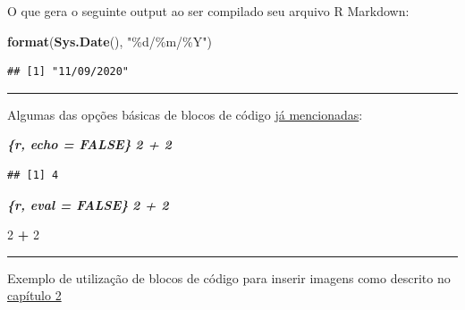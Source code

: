 \documentclass[
]{book}
\newenvironment{Shaded}{\begin{snugshade}}{\end{snugshade}}
\newcommand{\DecValTok}[1]{\textcolor[rgb]{0.00,0.00,0.81}{#1}}
\newcommand{\InformationTok}[1]{\textcolor[rgb]{0.56,0.35,0.01}{\textbf{\textit{#1}}}}
\newcommand{\KeywordTok}[1]{\textcolor[rgb]{0.13,0.29,0.53}{\textbf{#1}}}
\newcommand{\NormalTok}[1]{#1}
\newcommand{\OperatorTok}[1]{\textcolor[rgb]{0.81,0.36,0.00}{\textbf{#1}}}
\newcommand{\StringTok}[1]{\textcolor[rgb]{0.31,0.60,0.02}{#1}}
\begin{document}
O que gera o seguinte output ao ser compilado seu arquivo R Markdown:

\begin{Shaded}
\begin{Highlighting}[]
\KeywordTok{format}\NormalTok{(}\KeywordTok{Sys.Date}\NormalTok{(), }\StringTok{"\%d/\%m/\%Y"}\NormalTok{)}
\end{Highlighting}
\end{Shaded}

\begin{verbatim}
## [1] "11/09/2020"
\end{verbatim}

\begin{center}\rule{0.5\linewidth}{0.5pt}\end{center}

Algumas das opções básicas de blocos de código \protect\hyperlink{flags}{já mencionadas}:

\begin{Shaded}
\begin{Highlighting}[]
\InformationTok{\textasciigrave{}\textasciigrave{}\textasciigrave{}\{r, echo = FALSE\}}
\InformationTok{2 + 2}
\InformationTok{\textasciigrave{}\textasciigrave{}\textasciigrave{}}
\end{Highlighting}
\end{Shaded}

\begin{verbatim}
## [1] 4
\end{verbatim}

\begin{Shaded}
\begin{Highlighting}[]
\InformationTok{\textasciigrave{}\textasciigrave{}\textasciigrave{}\{r, eval = FALSE\}}
\InformationTok{2 + 2}
\InformationTok{\textasciigrave{}\textasciigrave{}\textasciigrave{}}
\end{Highlighting}
\end{Shaded}

\begin{Shaded}
\begin{Highlighting}[]
\DecValTok{2} \OperatorTok{+}\StringTok{ }\DecValTok{2}
\end{Highlighting}
\end{Shaded}

\begin{center}\rule{0.5\linewidth}{0.5pt}\end{center}

Exemplo de utilização de blocos de código para inserir imagens como descrito no \protect\hyperlink{inserindo-imagens}{capítulo 2}
\end{document}
